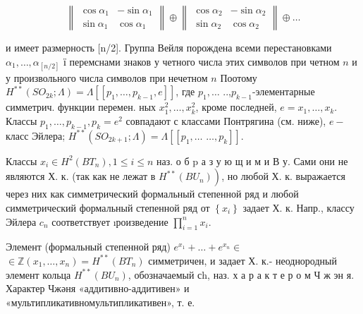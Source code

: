 \documentclass[10pt]{article}
\begin{document}
\[

\left\|\begin{array}{cr}

\cos \alpha_{1} & -\sin \alpha_{1} \\

\sin \alpha_{1} & \cos \alpha_{1}

\end{array}\right\| \oplus\left\|\begin{array}{cr}

\cos \alpha_{2} & -\sin \alpha_{2} \\

\sin \alpha_{2} & \cos \alpha_{2}

\end{array}\right\| \oplus \ldots

\]



и имеет размерность [n/2]. Группа Вейля порождена всеми перестановками $\alpha_{1}, \ldots, \alpha_{[n / 2]}$ ї перемснами знаков у четного числа этих символов при четном $n$ и у произвольного числа символов при нечетном $n$ Поотому $H^{* *}\left(S O_{2 k} ; \Lambda\right)=\Lambda\left[\left[p_{1}, \ldots, p_{k-1}, e\right]\right]$, где $p_{1}, \ldots$ ..,$p_{k-1}$-элементарные симметрич. функции перемен. ных $x_{1}^{2}, \ldots, x_{k}^{2}$, кроме последней, $e=x_{1}, \ldots, x_{k}$. Классы $p_{1}, \ldots, p_{k-1}, p_{k}=e^{2}$ совпадают с классами Понтрягина (см. ниже), $e-$ класс Эйлера; $H^{* *}\left(S O_{2 k+1} ; \Lambda\right)=\Lambda\left[\left[p_{1}, \ldots\right.\right.$ $\left.\left.\ldots, p_{k}\right]\right]$.



Классы $x_{i} \in H^{2}\left(B T_{n}\right), 1 \leqslant i \leqslant n$ наз. о б $\mathrm{p}$ а з у ю щ и м и В у. Сами они не являются Х. к. (так как не лежат в $\left.H^{* *}\left(B U_{n}\right)\right)$, но любой Х. к. выражается через них как симметрический формальный степенной ряд и любой симметрический формальный степенной ряд от $\left\{x_{i}\right\}$ задает Х. к. Напр., классу Эйлера $c_{n}$ соответствует ıроизведение $\prod_{i=1}^{n} x_{i}$.



Элемент (формальный степенной ряд) $e^{x_{1}}+\ldots+e^{x_{n}} \in$ $\in \mathbb{Z}\left(x_{1}, \ldots, x_{n}\right)=H^{* *}\left(B T_{n}\right)$ симметричен, и задает Х. к.- неоднородный элемент кольца $H^{* *}\left(B U_{n}\right)$, обозначаемый сh, наз. х а р а к т е р о м Ч ж эн я. Характер Чжәня «аддитивно-аддитивен» и «мультипликативномультипликативен», т. е.
\end{document}
